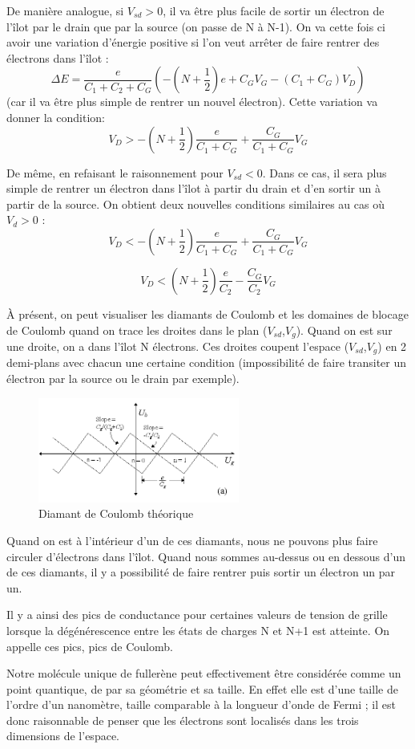 De manière analogue, si $V_{sd}>0$, il va être plus facile de sortir un électron de l'îlot par le drain que par la source (on passe de N à N-1). On va cette fois ci avoir une variation d'énergie positive si l'on veut arrêter de faire rentrer des électrons dans l'îlot :
\[\Delta E = \frac{e}{C_1 + C_2 + C_G}\left(-(N + \frac{1}{2})e + C_G V_G - (C_1 + C_G) V_D\right)\]
(car il va être plus simple de rentrer un nouvel électron). Cette variation va donner la condition:
\[V_D > - (N + \frac{1}{2})\frac{e}{C_1 + C_G} + \frac{C_G}{C_1 + C_G}V_G\]

De même, en refaisant le raisonnement pour $V_{sd}<0$. Dans ce cas, il sera plus simple de rentrer un électron dans l'îlot à partir du drain et d'en sortir un à partir de la source. On obtient deux nouvelles conditions similaires au cas où  $V_{d}>0$ :
\[V_D < - (N + \frac{1}{2})\frac{e}{C_1 + C_G} + \frac{C_G}{C_1 + C_G}V_G\]

\[V_D < (N + \frac{1}{2})\frac{e}{C_2} - \frac{C_G}{C_2}V_G\]

À présent, on peut visualiser les diamants de Coulomb et les domaines de blocage de Coulomb quand on trace les droites dans le plan ($V_{sd}$,$V_{g}$). Quand on est sur une droite, on a dans l'îlot N électrons. Ces droites coupent l'espace ($V_{sd}$,$V_{g}$) en 2 demi-plans avec chacun une certaine condition (impossibilité de faire transiter un électron par la source ou le drain par exemple).
\begin{figure}[h]
    \begin{center}
        \includegraphics[width=250px]{Images/Diamant_Coulomb_Theorie.png}
        \caption{Diamant de Coulomb théorique}
        \label{fig:}
    \end{center}
\end{figure}

Quand on est à l'intérieur d'un de ces diamants, nous ne pouvons plus faire circuler d'électrons dans l'îlot. Quand nous sommes au-dessus ou en dessous d'un de ces diamants, il y a possibilité de faire rentrer puis sortir un électron un par un.

Il y a ainsi des pics de conductance pour certaines valeurs de tension de grille lorsque la dégénérescence entre les états de charges N et N+1 est atteinte. On appelle ces pics, pics de Coulomb.

Notre molécule unique de fullerène peut effectivement être considérée comme un point quantique, de par sa géométrie et sa taille. En effet elle est d'une taille de l'ordre d'un nanomètre, taille comparable à la longueur d'onde de Fermi ; il est donc raisonnable de penser que les électrons sont localisés dans les trois dimensions de l'espace.
